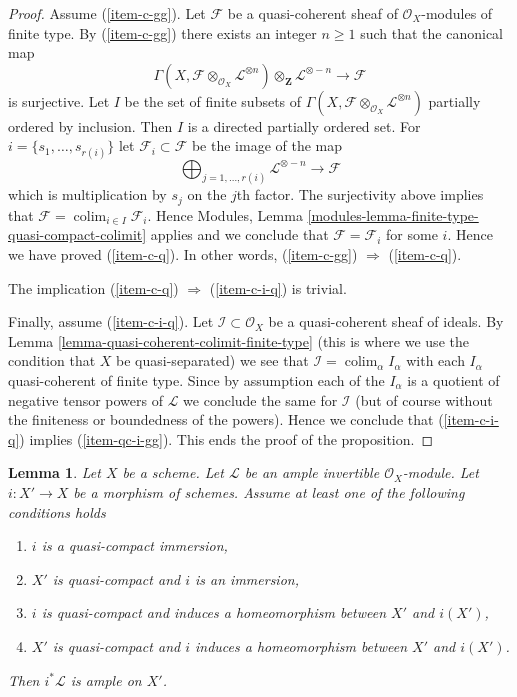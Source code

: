 \documentclass{stacks-project}
\theoremstyle{plain}
\newtheorem{lemma}[subsection]{Lemma}
\theoremstyle{definition}
\theoremstyle{remark}
\numberwithin{equation}{subsection}
\def\colim{\mathop{\mathrm{colim}}\nolimits}
\begin{document}
\begin{proof}
\medskip\noindent
Assume (\ref{item-c-gg}). Let $\mathcal{F}$ be a quasi-coherent
sheaf of $\mathcal{O}_X$-modules of finite type.
By (\ref{item-c-gg}) there exists an integer $n \geq 1$ such that
the canonical map
$$
\Gamma(X, \mathcal{F} \otimes_{\mathcal{O}_X} \mathcal{L}^{\otimes n})
\otimes_{\mathbf{Z}} \mathcal{L}^{\otimes -n}
\longrightarrow
\mathcal{F}
$$
is surjective. Let $I$ be the set of finite subsets of
$\Gamma(X, \mathcal{F} \otimes_{\mathcal{O}_X} \mathcal{L}^{\otimes n})$
partially ordered by inclusion. Then $I$ is a directed partially ordered set.
For $i = \{s_1, \ldots, s_{r(i)}\}$ let $\mathcal{F}_i \subset \mathcal{F}$
be the image of the map
$$
\bigoplus\nolimits_{j = 1, \ldots, r(i)} \mathcal{L}^{\otimes -n}
\longrightarrow
\mathcal{F}
$$
which is multiplication by $s_j$ on the $j$th factor. The surjectivity above
implies that $\mathcal{F} = \colim_{i \in I} \mathcal{F}_i$.
Hence Modules, Lemma \ref{modules-lemma-finite-type-quasi-compact-colimit}
applies and we conclude that
$\mathcal{F} = \mathcal{F}_i$ for some $i$.
Hence we have proved (\ref{item-c-q}). In other words,
(\ref{item-c-gg}) $\Rightarrow$ (\ref{item-c-q}).

\medskip\noindent
The implication (\ref{item-c-q}) $\Rightarrow$ (\ref{item-c-i-q}) is trivial.

\medskip\noindent
Finally, assume (\ref{item-c-i-q}).
Let $\mathcal{I} \subset \mathcal{O}_X$ be a quasi-coherent sheaf
of ideals. By Lemma \ref{lemma-quasi-coherent-colimit-finite-type}
(this is where we use the condition that $X$ be quasi-separated)
we see that $\mathcal{I} = \colim_\alpha I_\alpha$ with
each $I_\alpha$ quasi-coherent of finite type. Since by assumption each of
the $I_\alpha$ is a quotient of negative tensor powers of
$\mathcal{L}$ we conclude the same for $\mathcal{I}$ (but of course
without the finiteness or boundedness of the powers). Hence
we conclude that (\ref{item-c-i-q}) implies (\ref{item-qc-i-gg}).
This ends the proof of the proposition.
\end{proof}

\begin{lemma}
\label{lemma-ample-on-locally-closed}
Let $X$ be a scheme. Let $\mathcal{L}$ be an ample invertible
$\mathcal{O}_X$-module. Let $i : X' \to X$ be a morphism of schemes.
Assume at least one of the following conditions holds
\begin{enumerate}
\item $i$ is a quasi-compact immersion,
\item $X'$ is quasi-compact and $i$ is an immersion,
\item $i$ is quasi-compact and induces a homeomorphism
between $X'$ and $i(X')$,
\item $X'$ is quasi-compact and $i$ induces a homeomorphism
between $X'$ and $i(X')$.
\end{enumerate}
Then $i^*\mathcal{L}$ is ample on $X'$.
\end{lemma}
\end{document}
